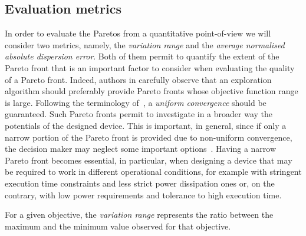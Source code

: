 \subsection{Evaluation metrics}
In order to evaluate the Paretos from a quantitative point-of-view we
will consider two metrics, namely, the \emph{variation range} and the
\emph{average normalised absolute dispersion error}. Both of them permit to quantify the extent of the Pareto front that is an important factor to consider when evaluating the quality of a Pareto front. Indeed, authors in \cite{zitzler_ec00,weise2012evolutionary} carefully observe that an exploration algorithm should preferably provide Pareto fronts whose objective function range is large. Following the terminology of~\cite{weise2012evolutionary}, a \emph{uniform convergence} should be guaranteed.
Such Pareto fronts permit to investigate in a broader way the potentials of the designed device. This is important, in general, since if only a narrow portion of the Pareto front is provided due to non-uniform convergence, the decision maker may neglect some important options~\cite{weise2012evolutionary}. Having a narrow Pareto front becomes essential, in particular, when designing a device that may be required to work in different operational conditions, for example with stringent execution time constraints and less strict power dissipation ones or, on the contrary, with low power requirements and tolerance to high execution time.

For a given objective, the \emph{variation range} represents the ratio between the maximum and the minimum value observed for that objective.


